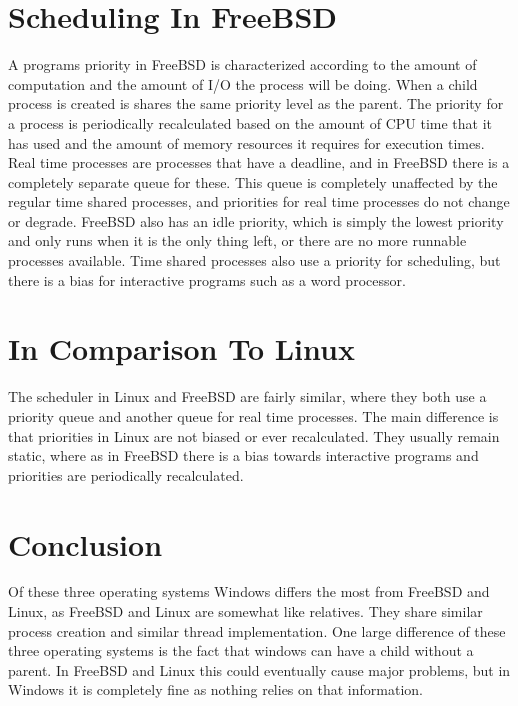 \documentclass[onecolumn, draftclsnofoot, 10pt, titlepage, compsoc]{IEEEtran}
\begin{document}
\section{Scheduling In FreeBSD}
A programs priority in FreeBSD is characterized according to the amount of computation and the amount of I/O the process will be doing. When a child process is created is shares the same priority level as the parent. The priority for a process is periodically recalculated based on the amount of CPU time that it has used and the amount of memory resources it requires for execution times. Real time processes are processes that have a deadline, and in FreeBSD there is a completely separate queue for these. This queue is completely unaffected by the regular time shared processes, and priorities for real time processes do not change or degrade. FreeBSD also has an idle priority, which is simply the lowest priority and only runs when it is the only thing left, or there are no more runnable processes available. Time shared processes also use a priority for scheduling, but there is a bias for interactive programs such as a word processor.
\section{In Comparison To Linux}
The scheduler in Linux and FreeBSD are fairly similar, where they both use a priority queue and another queue for real time processes. The main difference is that priorities in Linux are not biased or ever recalculated. They usually remain static, where as in FreeBSD there is a bias towards interactive programs and priorities are periodically recalculated.
\section{Conclusion}
Of these three operating systems Windows differs the most from FreeBSD and Linux, as FreeBSD and Linux are somewhat like relatives. They share similar process creation and similar thread implementation. One large difference of these three operating systems is the fact that windows can have a child without a parent. In FreeBSD and Linux this could eventually cause major problems, but in Windows it is completely fine as nothing relies on that information.
\nocite{*}


\end{document}
